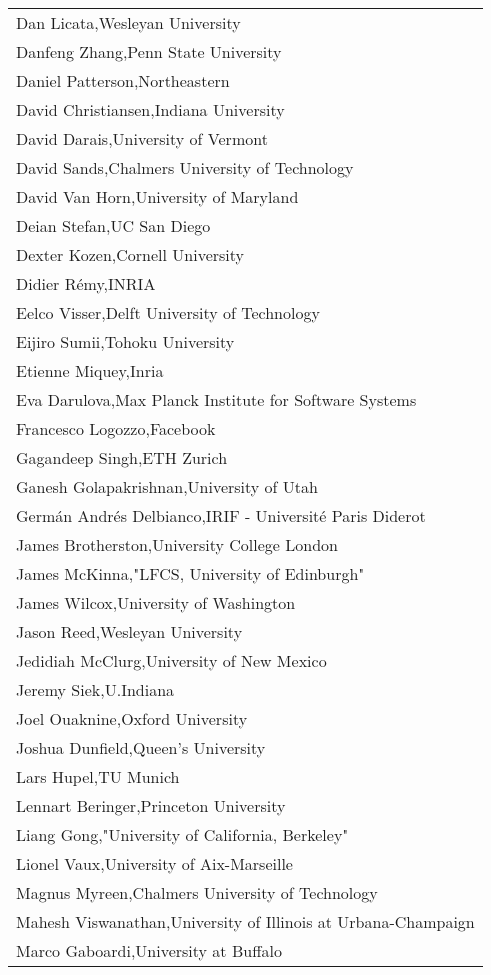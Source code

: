 \begin{tabular}[t]{@{}p{\namewidth}}
Dan Licata,Wesleyan University\\
Danfeng Zhang,Penn State University\\
Daniel Patterson,Northeastern\\
David Christiansen,Indiana University\\
David Darais,University of Vermont\\
David Sands,Chalmers University of Technology\\
David Van Horn,University of Maryland\\
Deian Stefan,UC San Diego\\
Dexter Kozen,Cornell University\\
Didier Rémy,INRIA\\
Eelco Visser,Delft University of Technology\\
Eijiro Sumii,Tohoku University\\
Etienne Miquey,Inria\\
Eva Darulova,Max Planck Institute for Software Systems\\
Francesco Logozzo,Facebook\\
Gagandeep Singh,ETH Zurich\\
Ganesh Golapakrishnan,University of Utah\\
Germán Andrés Delbianco,IRIF - Université Paris Diderot\\
James Brotherston,University College London\\
James McKinna,"LFCS, University of Edinburgh"\\
James Wilcox,University of Washington\\
Jason Reed,Wesleyan University\\
Jedidiah McClurg,University of New Mexico\\
Jeremy Siek,U.Indiana\\
Joel Ouaknine,Oxford University\\
Joshua Dunfield,Queen's University\\
Lars Hupel,TU Munich\\
Lennart Beringer,Princeton University\\
Liang Gong,"University of California, Berkeley"\\
Lionel Vaux,University of Aix-Marseille\\
Magnus Myreen,Chalmers University of Technology\\
Mahesh Viswanathan,University of Illinois at Urbana-Champaign\\
Marco Gaboardi,University at Buffalo\\

\end{tabular}
